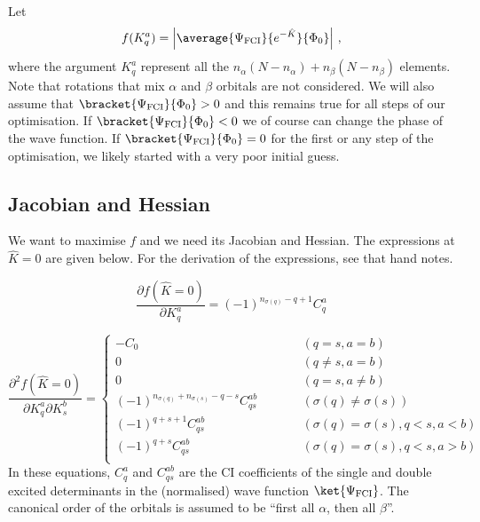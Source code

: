 \documentclass[a4paper,11pt]{article}
\begin{document}
Let
\begin{equation}
  f(K_q^a) = \left|\average{\Psi_\text{FCI}}{e^{-\hat{K}}}{\Phi_0}\right|\,,
\end{equation}
where the argument $K_q^a$ represent all the $n_\alpha(N-n_\alpha) + n_\beta(N-n_\beta)$ elements.
Note that rotations that mix $\alpha$ and $\beta$ orbitals are not considered.
We will also assume that $\bracket{\Psi_\text{FCI}}{\Phi_0} > 0$ and this remains true for all steps
of our optimisation.
If $\bracket{\Psi_\text{FCI}}{\Phi_0} < 0$ we of course can change the phase of the wave function.
If $\bracket{\Psi_\text{FCI}}{\Phi_0} = 0$ for the first or any step of the optimisation, we likely started with a very poor initial guess.

\subsection{Jacobian and Hessian}

We want to maximise $f$ and we need its Jacobian and Hessian.
The expressions at $\hat{K} = 0$ are given below.
For the derivation of the expressions, see that hand notes.

\begin{equation}
  \frac{\partial f(\hat{K} = 0)}{\partial K_q^a} = (-1)^{n_{\sigma(q)} - q + 1} C_q^a
\end{equation}

\begin{equation}
  \frac{\partial^2 f(\hat{K} = 0)}{\partial K_q^a \partial K_s^b} =
  \left\{
    \begin{array}{lcr}
      -C_0 & \quad\quad & (q = s, a = b)\\
      0   &  \quad\quad & (q \ne s, a = b)\\
      0   &  \quad\quad & (q = s, a \ne b)\\
      (-1)^{n_{\sigma(q)}+n_{\sigma(s)}-q-s}C_{qs}^{ab} & \quad\quad & (\sigma(q) \ne \sigma(s))\\
      (-1)^{q+s+1}C_{qs}^{ab} & \quad\quad & (\sigma(q) = \sigma(s), q<s, a<b)\\
      (-1)^{q+s}C_{qs}^{ab} & \quad\quad & (\sigma(q) = \sigma(s), q<s, a>b)\\
    \end{array}
  \right.
\end{equation}
In these equations, $C_q^a$ and $C_{qs}^{ab}$ are the CI coefficients of the single and double excited determinants in the (normalised) wave function $\ket{\Psi_\text{FCI}}$.
The canonical order of the orbitals is assumed to be ``first all $\alpha$, then all $\beta$''.
\end{document}
